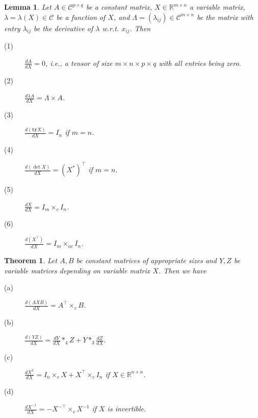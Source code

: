 \documentclass[10pt,a4paper]{amsart}
\newtheorem{lem}{Lemma}
\newtheorem{thm}{Theorem}
\newcommand{\C}{\mathcal{C}}
\newcommand{\La}{\Lambda}
\newcommand{\RR}{\mathbb{R}}
\newcommand{\la}{\lambda}
\newcommand{\tr}{\texttt{tr}}
\begin{document}
\begin{lem}\label{le3-1}
Let $A\in\C^{p\times q}$ be a constant matrix, $X\in\RR^{m\times n}$ a variable matrix, $\la=\la(X)\in\C$ be a function of $X$, and 
$\La=(\la_{ij})\in\C^{m\times n}$ be the matrix with entry $\la_{ij}$ be the derivative of $\la$ w.r.t. $x_{ij}$.  Then 
\begin{description}
\item[(1)]  $\frac{d A}{d X}=0$, i.e., a tensor of size $m\times n\times p\times q$ with all entries being zero.   
\item[(2)]  $\frac{d \la A}{d X}=\La\times A$. 
\item[(3)] $\frac{d(\tr X)}{dX} = I_{n}$ if $m=n$. 
\item[(4)] $\frac{d(\det X)}{dX}= (X^{\ast})^{\top}$ if $m=n$.
\item[(5)] $\frac{d X}{d X}= I_{m}\times_{c} I_{n}$.
\item[(6)] $\frac{d(X^{\top})}{dX}= I_{m}\times_{ac} I_{n}$.
\end{description}
\end{lem}

\begin{thm}\label{th3-2}
Let $A,B$ be constant matrices of appropriate sizes and $Y,Z$ be variable matrices depending on variable matrix $X$. Then we have 
\begin{description}
\item[(a)] $\frac{d (AXB)}{d X}=A^{\top}\times_{c} B$. 
\item[(b)] $\frac{d (YZ)}{d X}=\frac{dY}{dX}\ast_{4} Z +Y\ast_{3}\frac{dZ}{dX}$.
\item[(c)] $\frac{dX^{2}}{d X}=I_{n}\times_{c} X + X^{\top}\times_{c} I_{n}$ if $X\in\RR^{n\times n}$.
\item[(d)]  $\frac{d X^{-1}}{dX} =-X^{-\top}\times_{c} X^{-1}$ if $X$ is invertible.
\end{description}
\end{thm}
\end{document}

